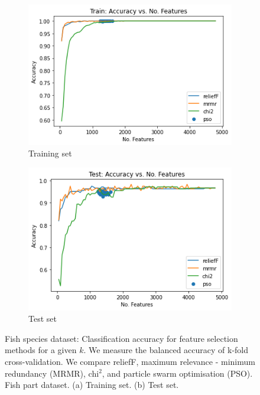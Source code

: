 \documentclass{article}
\begin{document}
\begin{figure}[htb]
  \centering
  \begin{subfigure}[b]{\linewidth}
    \includegraphics[width=1\linewidth]{accuracy-features-fish-train.png}
    \caption{Training set}
    \label{fig:accuracy-features-fish-train}
  \end{subfigure}

  \begin{subfigure}[b]{\linewidth}
    \includegraphics[width=1\linewidth]{accuracy-features-fish-test.png}
    \caption{Test set}
    \label{fig:accuracy-features-fish-test}
  \end{subfigure}

  \caption[Two numerical solutions]{
    Fish species dataset: Classification accuracy for feature selection methods for a given $k$.
    We measure the balanced accuracy of k-fold cross-validation.
    We compare reliefF, maximum relevance - minimum redundancy (MRMR), chi$^2$, and particle swarm optimisation (PSO).
    Fish part dataset. (a) Training set. (b) Test set.}
\end{figure}
\end{document}

